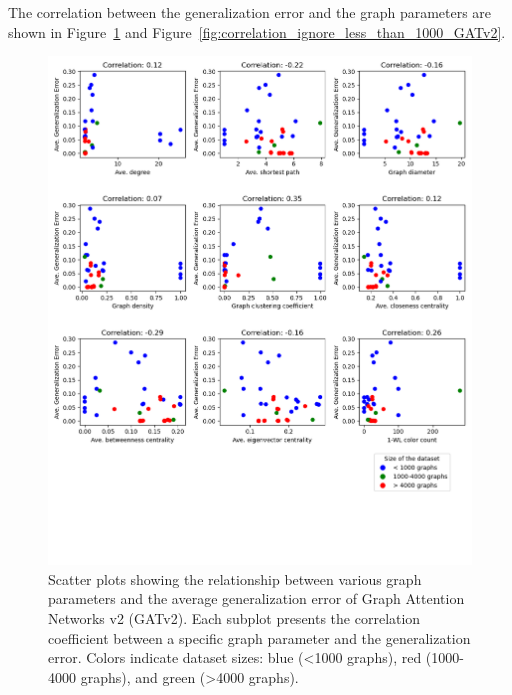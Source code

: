 The correlation between the generalization error and the graph parameters are shown in Figure~\ref{fig:correlation_GATv2} and Figure~\ref{fig:correlation_ignore_less_than_1000_GATv2}.

\begin{figure}[H]
    \centering
    \includegraphics[width=\textwidth]{images/correlation_GATv2.png}
    \caption{Scatter plots showing the relationship between various graph parameters and the average generalization error of Graph Attention Networks v2 (GATv2). Each subplot presents the correlation coefficient between a specific graph parameter and the generalization error. Colors indicate dataset sizes: blue (<1000 graphs), red (1000-4000 graphs), and green (>4000 graphs).}
    \label{fig:correlation_GATv2}
\end{figure}

